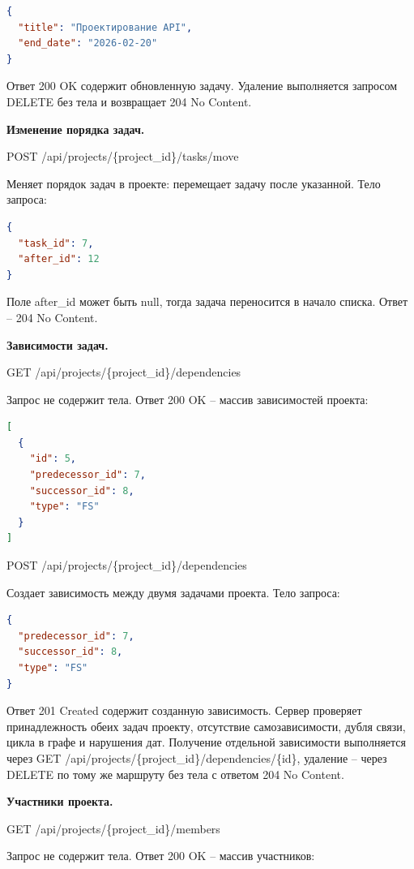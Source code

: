 \begin{lstlisting}[numbers=none, language=json]
{
  "title": "Проектирование API",
  "end_date": "2026-02-20"
}
\end{lstlisting}


Ответ 200 OK содержит обновленную задачу. Удаление выполняется запросом DELETE без тела и возвращает 204 No Content.

\textbf{Изменение порядка задач.}

POST /api/projects/\{project\_id\}/tasks/move

Меняет порядок задач в проекте: перемещает задачу после указанной. Тело запроса:

\begin{lstlisting}[numbers=none, language=json]
{
  "task_id": 7,
  "after_id": 12
}
\end{lstlisting}


Поле after\_id может быть null, тогда задача переносится в начало списка. Ответ -- 204 No Content.

\textbf{Зависимости задач.}

GET /api/projects/\{project\_id\}/dependencies

Запрос не содержит тела. Ответ 200 OK -- массив зависимостей проекта:

\begin{lstlisting}[numbers=none, language=json]
[
  {
    "id": 5,
    "predecessor_id": 7,
    "successor_id": 8,
    "type": "FS"
  }
]
\end{lstlisting}


POST /api/projects/\{project\_id\}/dependencies

Создает зависимость между двумя задачами проекта. Тело запроса:

\begin{lstlisting}[numbers=none, language=json]
{
  "predecessor_id": 7,
  "successor_id": 8,
  "type": "FS"
}
\end{lstlisting}


Ответ 201 Created содержит созданную зависимость. Сервер проверяет принадлежность обеих задач проекту, отсутствие самозависимости, дубля связи, цикла в графе и нарушения дат. Получение отдельной зависимости выполняется через GET /api/projects/\{project\_id\}/dependencies/\{id\}, удаление -- через DELETE по тому же маршруту без тела с ответом 204 No Content.

\textbf{Участники проекта.}

GET /api/projects/\{project\_id\}/members

Запрос не содержит тела. Ответ 200 OK -- массив участников:

